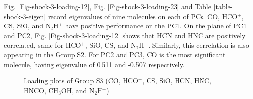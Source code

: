 \documentclass{aa}
\begin{document}
\begin{CJK*}{UTF8}{gbsn}
    Fig. \ref{Fig-shock-3-loading-12}, Fig. \ref{Fig-shock-3-loading-23} and Table \ref{table-shock-3-eigen} record eigenvalues of nine molecules on each of PCs. CO, HCO$^+$, CS, SiO, and N$_2$H$^+$ have positive performance on the PC1. 
    On the plane of PC1 and PC2, Fig. \ref{Fig-shock-3-loading-12} shows that HCN and HNC are positively correlated, same for HCO$^+$, SiO, CS, and N$_2$H$^+$. Similarly, this correlation is also appearing in the Group S2. 
    For PC2 and PC3, CO is the most significant molecule, having eigenvalue of 0.511 and -0.507 respectively. 

 \begin{figure}[htbp]
\centering  
{}
\caption{Loading plots of Group S3 (CO, HCO$^+$, CS, SiO, HCN, HNC, HNCO, CH$_3$OH, and N$_2$H$^+$)}
\label{Fig-shock-3-loading}
\end{figure}




\end{CJK*}
\end{document}
